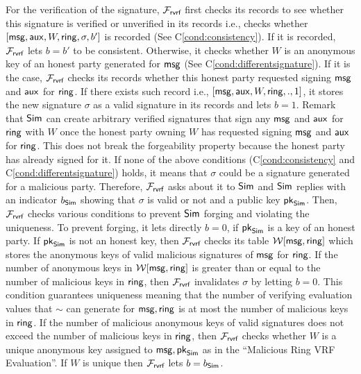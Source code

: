 For the verification of the signature, $ \mathcal{F}_{\textsf{rvrf}} $  first checks its records to see whether this signature is verified or unverified in its records i.e., checks  whether $ [\mathsf{msg},\mathsf{aux},W,\mathsf{ring},\sigma, b'] $ is recorded (See  C\ref{cond:consistency}). If it is recorded, $ \mathcal{F}_{\textsf{rvrf}} $ lets  $ b = b' $ to be consistent. Otherwise, it checks whether $ W $ is an anonymous key of an honest party generated for $ \mathsf{msg} $ (See C\ref{cond:differentsignature}). If it is the case, $ \mathcal{F}_{\textsf{rvrf}} $ checks  its records whether this honest party requested signing  $ \mathsf{msg} $ and $ \mathsf{aux} $ for $ \mathsf{ring} $.  If there exists such record i.e., $ [\mathsf{msg}, \mathsf{aux}, W, \mathsf{ring}, ., 1] $, it stores the new signature $ \sigma $ as a valid signature in its records and lets $ b = 1 $. Remark that $ \mathsf{Sim} $ can create arbitrary verified signatures that sign any $ \mathsf{msg} $ and $ \mathsf{aux} $ for $ \mathsf{ring} $ with $ W $ once the honest party owning $ W $ has requested signing $ \mathsf{msg} $ and $ \mathsf{aux} $ for $ \mathsf{ring} $. This does not break the forgeability property because the honest party has already signed for it. 
If none of the above conditions (C\ref{cond:consistency} and C\ref{cond:differentsignature}) holds, it means that $ \sigma $ could be a signature generated for a malicious party. Therefore, $ \mathcal{F}_{\textsf{rvrf}} $ asks about it to $ \mathsf{Sim} $ and $ \mathsf{Sim} $ replies with an indicator $ b_{\mathsf{Sim}} $ showing that $ \sigma  $ is valid or not and a public key $ \mathsf{pk}_{\mathsf{Sim}} $. Then, $ \mathcal{F}_{\textsf{rvrf}} $ checks various conditions to prevent $ \mathsf{Sim} $ forging and violating the uniqueness. To prevent forging, it lets  directly $ b = 0 $, if $ \mathsf{pk}_{\mathsf{Sim}} $ is a key of an honest party. If $ \mathsf{pk}_{\mathsf{Sim}} $ is not an honest key, then $ \mathcal{F}_{\textsf{rvrf}} $ checks its table $ \mathcal{W}[\mathsf{msg},\mathsf{ring}] $ which stores the anonymous keys of valid malicious signatures of $ \mathsf{msg} $ for $ \mathsf{ring} $. If the number of anonymous keys in $ \mathcal{W}[\mathsf{msg},\mathsf{ring}] $ is greater than or equal to the number of malicious keys in $ \mathsf{ring} $, then $ \mathcal{F}_{\textsf{rvrf}} $ invalidates $ \sigma $ by letting $ b = 0 $. This condition guarantees  uniqueness meaning that the number of verifying evaluation values that $ \sim $ can generate for $ \mathsf{msg}, \mathsf{ring} $ is at most the  number of malicious keys in $ \mathsf{ring} $. If the number of malicious anonymous keys of valid signatures does not exceed the number of malicious keys in $ \mathsf{ring} $, then $ \mathcal{F}_{\textsf{rvrf}} $ checks whether $ W $ is a unique anonymous key assigned to $ \mathsf{msg},\mathsf{pk}_{\mathsf{Sim}} $ as in the ``Malicious Ring VRF Evaluation''. If $ W $ is unique then $ \mathcal{F}_{\textsf{rvrf}} $ lets $ b = b_{\mathsf{Sim}} $.

